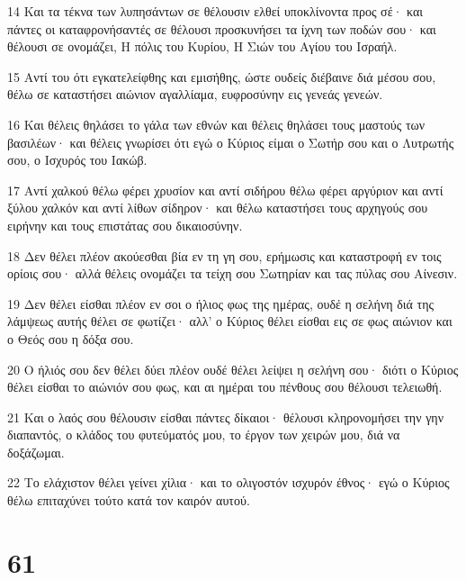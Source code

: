 \par 14 Και τα τέκνα των λυπησάντων σε θέλουσιν ελθεί υποκλίνοντα προς σέ· και πάντες οι καταφρονήσαντές σε θέλουσι προσκυνήσει τα ίχνη των ποδών σου· και θέλουσι σε ονομάζει, Η πόλις του Κυρίου, Η Σιών του Αγίου του Ισραήλ.
\par 15 Αντί του ότι εγκατελείφθης και εμισήθης, ώστε ουδείς διέβαινε διά μέσου σου, θέλω σε καταστήσει αιώνιον αγαλλίαμα, ευφροσύνην εις γενεάς γενεών.
\par 16 Και θέλεις θηλάσει το γάλα των εθνών και θέλεις θηλάσει τους μαστούς των βασιλέων· και θέλεις γνωρίσει ότι εγώ ο Κύριος είμαι ο Σωτήρ σου και ο Λυτρωτής σου, ο Ισχυρός του Ιακώβ.
\par 17 Αντί χαλκού θέλω φέρει χρυσίον και αντί σιδήρου θέλω φέρει αργύριον και αντί ξύλου χαλκόν και αντί λίθων σίδηρον· και θέλω καταστήσει τους αρχηγούς σου ειρήνην και τους επιστάτας σου δικαιοσύνην.
\par 18 Δεν θέλει πλέον ακούεσθαι βία εν τη γη σου, ερήμωσις και καταστροφή εν τοις ορίοις σου· αλλά θέλεις ονομάζει τα τείχη σου Σωτηρίαν και τας πύλας σου Αίνεσιν.
\par 19 Δεν θέλει είσθαι πλέον εν σοι ο ήλιος φως της ημέρας, ουδέ η σελήνη διά της λάμψεως αυτής θέλει σε φωτίζει· αλλ' ο Κύριος θέλει είσθαι εις σε φως αιώνιον και ο Θεός σου η δόξα σου.
\par 20 Ο ήλιός σου δεν θέλει δύει πλέον ουδέ θέλει λείψει η σελήνη σου· διότι ο Κύριος θέλει είσθαι το αιώνιόν σου φως, και αι ημέραι του πένθους σου θέλουσι τελειωθή.
\par 21 Και ο λαός σου θέλουσιν είσθαι πάντες δίκαιοι· θέλουσι κληρονομήσει την γην διαπαντός, ο κλάδος του φυτεύματός μου, το έργον των χειρών μου, διά να δοξάζωμαι.
\par 22 Το ελάχιστον θέλει γείνει χίλια· και το ολιγοστόν ισχυρόν έθνος· εγώ ο Κύριος θέλω επιταχύνει τούτο κατά τον καιρόν αυτού.

\chapter{61}

